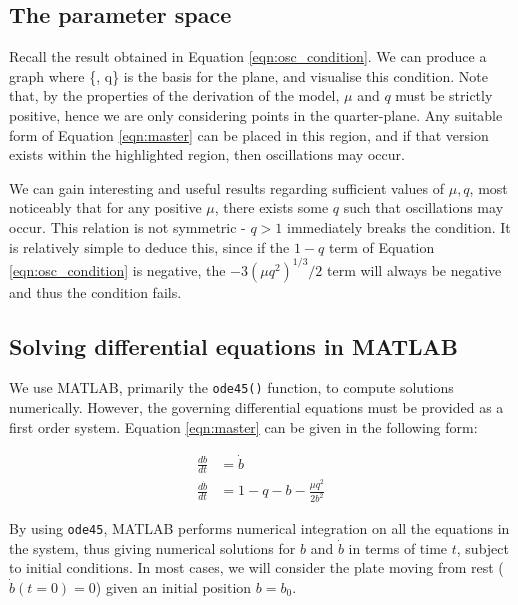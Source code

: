 \documentclass{article}
\begin{document}

\subsection{The parameter space}


Recall the result obtained in Equation \ref{eqn:osc_condition}.
We can produce a graph where \{\mu, q\} is the basis for the plane,
and visualise this condition.
Note that, by the properties of the derivation of the model,
$\mu$ and $q$ must be strictly positive,
hence we are only considering points in the quarter-plane.
Any suitable form of Equation \ref{eqn:master} can be placed in this region,
and if that version exists within the highlighted region,
then oscillations may occur.

We can gain interesting and useful results regarding sufficient values of $\mu, q$,
most noticeably that for any positive $\mu$, there exists some $q$ such that oscillations may occur.
This relation is not symmetric - $q>1$ immediately breaks the condition.
It is relatively simple to deduce this, since if the $1-q$ term of Equation \ref{eqn:osc_condition} is negative,
the $-3(\mu q^2)^{1/3}/2$ term will always be negative and thus the condition fails.

\subsection{Solving differential equations in MATLAB}

We use MATLAB, primarily the \texttt{ode45()} function, to compute solutions numerically.
However, the governing differential equations must be provided as a first order system.
Equation \ref{eqn:master} can be given in the following form:

\begin{align}
    \frac{db}{dt} &= \dot{b} \\
    \frac{d\dot{b}}{dt} &= 1 - q - b - \frac{\mu q^2}{2b^2}
\end{align}

By using \texttt{ode45}, MATLAB performs numerical integration on all the equations in the system,
thus giving numerical solutions for $b$ and $\dot{b}$ in terms of time $t$, subject to initial conditions.
In most cases, we will consider the plate moving from rest ($\dot{b}(t=0) = 0$) given an initial position $b=b_0$.
\end{document}
